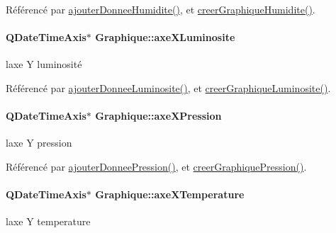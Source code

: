 Référencé par \hyperlink{class_graphique_ad3dd36f05a9923054a0a2138f96f0311}{ajouter\+Donnee\+Humidite()}, et \hyperlink{class_graphique_a19d6deef2d11e95093a343d49f75d14e}{creer\+Graphique\+Humidite()}.

\paragraph[{\texorpdfstring{axe\+X\+Luminosite}{axeXLuminosite}}]{\setlength{\rightskip}{0pt plus 5cm}Q\+Date\+Time\+Axis$\ast$ Graphique\+::axe\+X\+Luminosite\hspace{0.3cm}{\ttfamily [private]}}\hypertarget{class_graphique_ae4daff72419cbb9e49209f931e79a83b}{}\label{class_graphique_ae4daff72419cbb9e49209f931e79a83b}
l\textquotesingle{}axe Y luminosité 

Référencé par \hyperlink{class_graphique_a1af0e1968998cb7b5ee8add1197cb0e0}{ajouter\+Donnee\+Luminosite()}, et \hyperlink{class_graphique_a3b55b9c4732856e1b25bef167c25ac4c}{creer\+Graphique\+Luminosite()}.

\paragraph[{\texorpdfstring{axe\+X\+Pression}{axeXPression}}]{\setlength{\rightskip}{0pt plus 5cm}Q\+Date\+Time\+Axis$\ast$ Graphique\+::axe\+X\+Pression\hspace{0.3cm}{\ttfamily [private]}}\hypertarget{class_graphique_a343286de3f9c610257a140c1bf5c4755}{}\label{class_graphique_a343286de3f9c610257a140c1bf5c4755}
l\textquotesingle{}axe Y pression 

Référencé par \hyperlink{class_graphique_a289f0631e56465012511fd7ec9da1b23}{ajouter\+Donnee\+Pression()}, et \hyperlink{class_graphique_adc50b5ae7a54dd576c99e74ec6bf74c5}{creer\+Graphique\+Pression()}.

\paragraph[{\texorpdfstring{axe\+X\+Temperature}{axeXTemperature}}]{\setlength{\rightskip}{0pt plus 5cm}Q\+Date\+Time\+Axis$\ast$ Graphique\+::axe\+X\+Temperature\hspace{0.3cm}{\ttfamily [private]}}\hypertarget{class_graphique_a83ef0cdf381f66a6202022b8545bfb1c}{}\label{class_graphique_a83ef0cdf381f66a6202022b8545bfb1c}
l\textquotesingle{}axe Y temperature 

